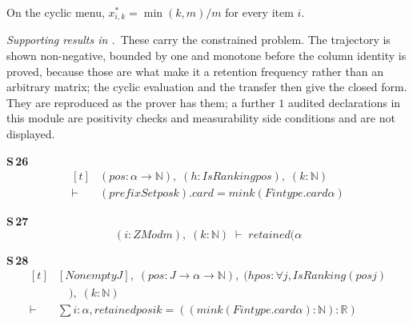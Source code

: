 
\begin{theorem}
\label{thm:cyclic}
On the cyclic menu, $x^{*}_{i,k}=\min(k,m)/m$ for every item $i$.
\end{theorem}


\noindent\emph{Supporting results in .}~These carry the constrained problem. The trajectory is shown non-negative, bounded by one and monotone before the column identity is proved, because those are what make it a retention frequency rather than an arbitrary matrix; the cyclic evaluation and the transfer then give the closed form. They are reproduced as the prover has them; a further $1$ audited declarations in this module are positivity checks and measurability side conditions and are not displayed.

\noindent\textbf{S\,26}\quad{}
{\footnotesize\[ \begin{aligned}[t]
&(\mathit{pos} : \alpha \to \mathbb{N} ),\; (\mathit{h} : \mathit{IsRanking} \mathit{pos}),\; (\mathit{k} : \mathbb{N} )\\
\vdash\;&(\mathit{prefixSet} \mathit{pos} \mathit{k}).\mathit{card} = \mathit{min} \mathit{k} (\mathit{Fintype}.\mathit{card} \alpha )
\end{aligned} \]}

\noindent\textbf{S\,27}\quad{}
{\footnotesize\[ (\mathit{i} : \mathit{ZMod} \mathit{m}),\; (\mathit{k} : \mathbb{N} ) \;\vdash\; \mathit{retained} (\alpha \]}

\noindent\textbf{S\,28}\quad{}
{\footnotesize\[ \begin{aligned}[t]
&[\mathit{Nonempty} \mathit{J}],\; (\mathit{pos} : \mathit{J} \to \alpha \to \mathbb{N} ),\; (\mathit{hpos} : \forall \mathit{j}, \mathit{IsRanking} (\mathit{pos} \mathit{j})\\
&\quad ),\; (\mathit{k} : \mathbb{N} )\\
\vdash\;&\textstyle\sum \mathit{i} : \alpha , \mathit{retained} \mathit{pos} \mathit{i} \mathit{k} = ((\mathit{min} \mathit{k} (\mathit{Fintype}.\mathit{card} \alpha ) : \mathbb{N} ) : \mathbb{R} )
\end{aligned} \]}

